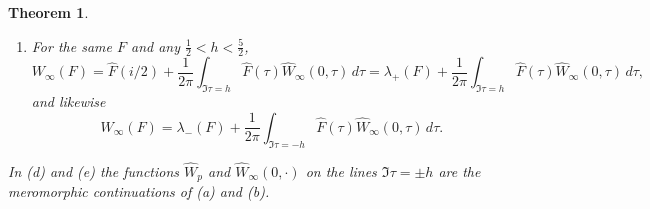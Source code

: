 \documentclass[11pt]{amsart}
\newtheorem{theorem}{Theorem}[section]
\theoremstyle{definition}
\theoremstyle{remark}
\newcommand{\Z}{\mathbb Z}
\newcommand{\Wh}{\widehat{W}}
\begin{document}
\begin{theorem}
\begin{enumerate}
\begin{equation}\label{eq:contourp}
W_p(F)=\sum_{k\in\Z}\widehat F\Bigl(\frac{i}{2}+\frac{2\pi k}{\log p}\Bigr)
+\frac{1}{2\pi}\int_{\Im\tau=h}\widehat F(\tau)\Wh_p(\tau)\,d\tau ,
\end{equation}
both terms absolutely convergent, and the sum is the Poisson periodization
\begin{equation}\label{eq:poisson}
\sum_{k\in\Z}\widehat F\Bigl(\frac i2+\frac{2\pi k}{\log p}\Bigr)
=(\log p)\sum_{m\in\Z}f(m\log p)\,p^{m/2}.
\end{equation}
\item[(e)] For the same $F$ and any $\tfrac12<h<\tfrac52$,
\begin{equation}\label{eq:contourinf}
W_{\infty}(F)=\widehat F(i/2)
+\frac{1}{2\pi}\int_{\Im\tau=h}\widehat F(\tau)\Wh_{\infty}(0,\tau)\,d\tau
=\lambda_+(F)+\frac{1}{2\pi}\int_{\Im\tau=h}\widehat F(\tau)
\Wh_{\infty}(0,\tau)\,d\tau ,
\end{equation}
and likewise
\begin{equation}\label{eq:contourinfminus}
W_{\infty}(F)=\lambda_-(F)+\frac{1}{2\pi}\int_{\Im\tau=-h}\widehat F(\tau)
\Wh_{\infty}(0,\tau)\,d\tau .
\end{equation}
\end{enumerate}
In (d) and (e) the functions $\Wh_p$ and $\Wh_{\infty}(0,\cdot)$ on the lines
$\Im\tau=\pm h$ are the meromorphic continuations of (a) and (b).
\end{theorem}
\end{document}
